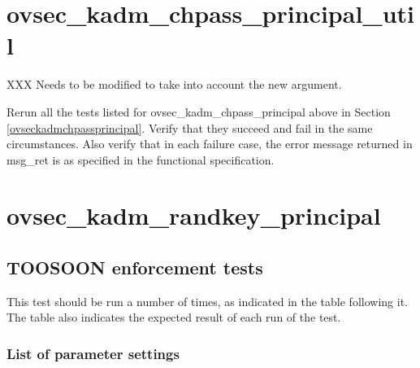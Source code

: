 



\section{ovsec_kadm_chpass_principal_util}

XXX Needs to be modified to take into account the new argument.

Rerun all the tests listed for ovsec_kadm_chpass_principal above in
Section \ref{ovseckadmchpassprincipal}.  Verify that they succeed
and fail in the same circumstances.  Also verify that in each failure
case, the error message returned in msg_ret is as specified in the
functional specification.



\section{ovsec_kadm_randkey_principal}

\subsection{TOOSOON enforcement tests}

This test should be run a number of times, as indicated in the table
following it.  The table also indicates the expected result of each
run of the test.


\subsubsection{List of parameter settings}

